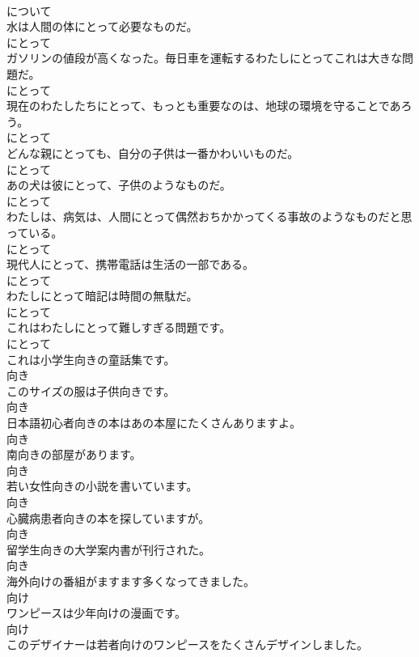 \documentclass[8pt]{extreport}
\begin{document}
\begin{CJK}{UTF8}{min}
\\	について
\\	水は人間の体にとって必要なものだ。	
\\	にとって
\\	ガソリンの値段が高くなった。毎日車を運転するわたしにとってこれは大きな問題だ。	
\\	にとって
\\	現在のわたしたちにとって、もっとも重要なのは、地球の環境を守ることであろう。	
\\	にとって
\\	どんな親にとっても、自分の子供は一番かわいいものだ。	
\\	にとって
\\	あの犬は彼にとって、子供のようなものだ。	
\\	にとって
\\	わたしは、病気は、人間にとって偶然おちかかってくる事故のようなものだと思っている。	
\\	にとって
\\	現代人にとって、携帯電話は生活の一部である。	
\\	にとって
\\	わたしにとって暗記は時間の無駄だ。	
\\	にとって
\\	これはわたしにとって難しすぎる問題です。	
\\	にとって
\\	これは小学生向きの童話集です。	
\\	向き
\\	このサイズの服は子供向きです。	
\\	向き
\\	日本語初心者向きの本はあの本屋にたくさんありますよ。	
\\	向き
\\	南向きの部屋があります。	
\\	向き
\\	若い女性向きの小説を書いています。	
\\	向き
\\	心臓病患者向きの本を探していますが。	
\\	向き
\\	留学生向きの大学案内書が刊行された。	
\\	向き
\\	海外向けの番組がますます多くなってきました。	
\\	向け
\\	ワンピースは少年向けの漫画です。	
\\	向け
\\	このデザイナーは若者向けのワンピースをたくさんデザインしました。	

\end{CJK}
\end{document}

